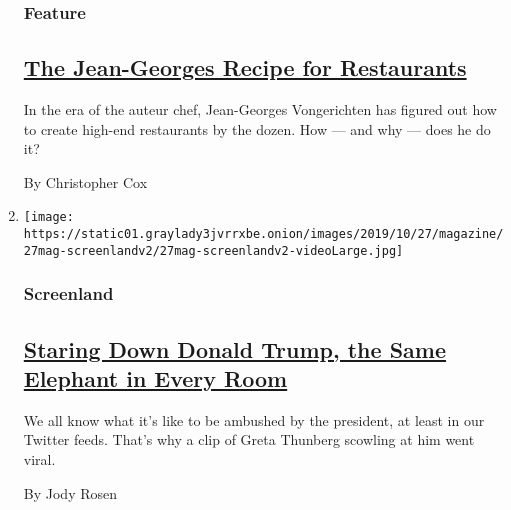 \begin{enumerate}
  \hypertarget{feature-1}{%
  \subsubsection{Feature}\label{feature-1}}

  \hypertarget{the-jean-georges-recipe-for-restaurants}{%
  \subsection{\texorpdfstring{\href{/2019/10/17/magazine/jean-georges-restaurants.html}{The
  Jean-Georges Recipe for
  Restaurants}}{The Jean-Georges Recipe for Restaurants}}\label{the-jean-georges-recipe-for-restaurants}}

  In the era of the auteur chef, Jean-Georges Vongerichten has figured
  out how to create high-end restaurants by the dozen. How --- and why
  --- does he do it?

  By Christopher Cox
\item
  \texttt{[image: https://static01.graylady3jvrrxbe.onion/images/2019/10/27/magazine/27mag-screenlandv2/27mag-screenlandv2-videoLarge.jpg]}

  \hypertarget{screenland}{%
  \subsubsection{Screenland}\label{screenland}}

  \hypertarget{staring-down-donald-trump-the-same-elephant-in-every-room}{%
  \subsection{\texorpdfstring{\href{/2019/10/16/magazine/the-same-elephant-in-every-room.html}{Staring
  Down Donald Trump, the Same Elephant in Every
  Room}}{Staring Down Donald Trump, the Same Elephant in Every Room}}\label{staring-down-donald-trump-the-same-elephant-in-every-room}}

  We all know what it's like to be ambushed by the president, at least
  in our Twitter feeds. That's why a clip of Greta Thunberg scowling at
  him went viral.

  By Jody Rosen
\end{enumerate}

